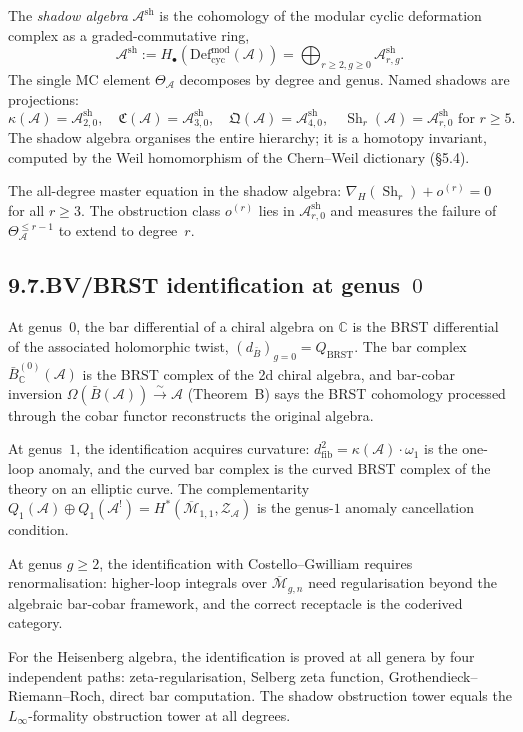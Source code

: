 \documentclass[11pt,reqno]{amsart}
\theoremstyle{definition}
\theoremstyle{remark}
\providecommand{\cA}{\mathcal{A}}
\providecommand{\cM}{\mathcal{M}}
\providecommand{\cZ}{\mathcal{Z}}
\providecommand{\barB}{\bar{B}}
\providecommand{\Defcyc}{\mathrm{Def}_{\mathrm{cyc}}}
\providecommand{\Defcyc}{\mathrm{Def}_{\mathrm{cyc}}}
\numberwithin{equation}{section}
\begin{document}
The \emph{shadow algebra} $\cA^{\mathrm{sh}}$ is the cohomology of the
modular cyclic deformation complex as a graded-commutative ring,
\[
\cA^{\mathrm{sh}}:=H_\bullet(\Defcyc^{\mathrm{mod}}(\cA))=\bigoplus_{r\ge 2,g\ge 0}\cA^{\mathrm{sh}}_{r,g}.
\]
The single MC element $\Theta_\cA$ decomposes by degree and genus.
Named shadows are projections:
\[
\kappa(\cA)=\cA^{\mathrm{sh}}_{2,0},\quad\mathfrak C(\cA)=\cA^{\mathrm{sh}}_{3,0},\quad\mathfrak Q(\cA)=\cA^{\mathrm{sh}}_{4,0},\quad\operatorname{Sh}_r(\cA)=\cA^{\mathrm{sh}}_{r,0}\text{ for }r\ge 5.
\]
The shadow algebra organises the entire hierarchy; it is a homotopy
invariant, computed by the Weil homomorphism of the Chern--Weil
dictionary (\S5.4).

The all-degree master equation in the shadow algebra:
$\nabla_H(\operatorname{Sh}_r)+o^{(r)}=0$ for all $r\ge 3$. The
obstruction class $o^{(r)}$ lies in $\cA^{\mathrm{sh}}_{r,0}$ and
measures the failure of $\Theta^{\le r-1}_\cA$ to extend to degree~$r$.

\subsection*{9.7.\enspace BV/BRST identification at genus~$0$}

At genus~$0$, the bar differential of a chiral algebra on $\mathbb C$
is the BRST differential of the associated holomorphic twist,
$(d_{\barB})_{g=0}=Q_{\mathrm{BRST}}$. The bar complex
$\barB^{(0)}_{\mathbb C}(\cA)$ is the BRST complex of the 2d chiral
algebra, and bar-cobar inversion
$\Omega(\barB(\cA))\xrightarrow{\sim}\cA$ (Theorem~B) says the BRST
cohomology processed through the cobar functor reconstructs the
original algebra.

At genus~$1$, the identification acquires curvature:
$d^2_{\mathrm{fib}}=\kappa(\cA)\cdot\omega_1$ is the one-loop anomaly,
and the curved bar complex is the curved BRST complex of the theory
on an elliptic curve. The complementarity
$Q_1(\cA)\oplus Q_1(\cA^!)=H^*(\overline{\cM}_{1,1},\cZ_\cA)$ is the
genus-$1$ anomaly cancellation condition.

At genus $g\ge 2$, the identification with Costello--Gwilliam
requires renormalisation: higher-loop integrals over
$\overline{\cM}_{g,n}$ need regularisation beyond the algebraic
bar-cobar framework, and the correct receptacle is the coderived
category.

For the Heisenberg algebra, the identification is proved at all genera
by four independent paths: zeta-regularisation, Selberg zeta function,
Grothendieck--Riemann--Roch, direct bar computation. The shadow
obstruction tower equals the $L_\infty$-formality obstruction tower
at all degrees.
\end{document}
